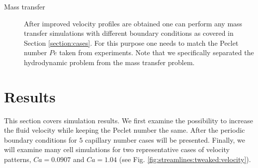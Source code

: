 \documentclass{article}
\newcommand{\ububble}{U_{\mathrm{bubble}}}
\begin{document}
\begin{description}
\item[Mass transfer] After improved velocity profiles are obtained one can perform any mass
transfer simulations with different boundary conditions as covered in Section \ref{section:cases}.
For this purpose one needs to match the Peclet number $Pe$ taken from experiments. Note that we
specifically separated the hydrodynamic problem from the mass transfer problem. 
\end{description}

\section{Results}
This section covers simulation results. We first examine the possibility to increase the fluid
velocity while keeping the Peclet number the same. After the periodic boundary
conditions for $5$ capillary number cases will be presented. Finally, we will examine
many
cell simulations for two representative cases of velocity patterns, $Ca=0.0907$ and $Ca=1.04$
(see Fig. \ref{fig:streamlines:tweaked:velocity}). 
\end{document}
